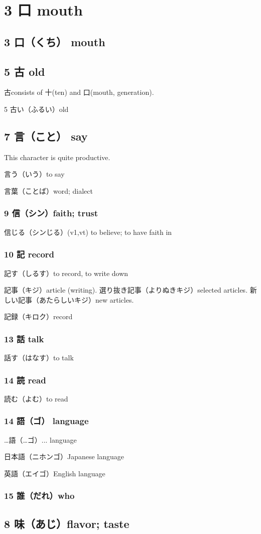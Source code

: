 \chapter{3 口 mouth}

\section{3 口（くち） mouth}

\section{5 古 old}

古consists of 十(ten) and 口(mouth, generation).

5 古い（ふるい）old

\section{7 言（こと） say}

This character is quite productive.

言う（いう）to say

言葉（ことば）word; dialect

\subsection{9 信（シン）faith; trust}

信じる（シンじる）(v1,vt) to believe; to have faith in

\subsection{10 記 record}

記す（しるす）to record, to write down

記事（キジ）article (writing).
選り抜き記事（よりぬきキジ）selected articles.
新しい記事（あたらしいキジ）new articles.

記録（キロク）record

\subsection{13 話 talk}

話す（はなす）to talk

\subsection{14 読 read}

読む（よむ）to read

\subsection{14 語（ゴ） language}

…語（…ゴ）... language

日本語（ニホンゴ）Japanese language

英語（エイゴ）English language

\subsection{15 誰（だれ）who}

\section{8 味（あじ）flavor; taste}
